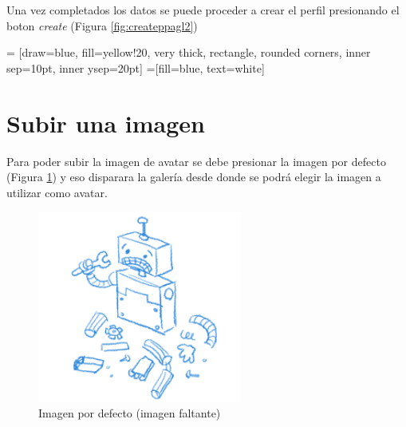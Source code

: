 \documentclass[10pt,letterpaper,extrafontsizes]{memoir}
\begin{document}
Una vez completados los datos se puede proceder a crear el perfil presionando el boton \emph{create} (Figura \ref{fig:createppagl2})

\begin{center}
 = [draw=blue, fill=yellow!20, very thick,
    rectangle, rounded corners, inner sep=10pt, inner ysep=20pt]
 =[fill=blue, text=white]
\end{center}
%

\section{Subir una imagen}

Para poder subir la imagen de avatar se debe presionar la imagen por defecto (Figura \ref{fig:notfound}) y eso disparara la galería desde donde se podrá elegir la imagen a utilizar como avatar.

\begin{figure}[H]
    \centering
\includegraphics[width=0.6\textwidth]{graficos/imagenes/not_found}
    \caption{Imagen por defecto (imagen faltante)}
    \label{fig:notfound}
\end{figure}
\end{document}

